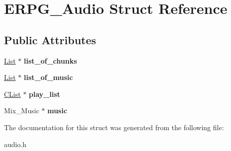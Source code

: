 \hypertarget{structERPG__Audio}{\section{E\-R\-P\-G\-\_\-\-Audio Struct Reference}
\label{structERPG__Audio}
}
\subsection*{Public Attributes}
\begin{DoxyCompactItemize}
\item 
\hypertarget{structERPG__Audio_a8f2bd7d006c2c6497637154fc92372c1}{\hyperlink{structList}{List} $\ast$ {\bfseries list\-\_\-of\-\_\-chunks}}\label{structERPG__Audio_a8f2bd7d006c2c6497637154fc92372c1}

\item 
\hypertarget{structERPG__Audio_a95dd40022b4d3deb2f32c62647495a3d}{\hyperlink{structList}{List} $\ast$ {\bfseries list\-\_\-of\-\_\-music}}\label{structERPG__Audio_a95dd40022b4d3deb2f32c62647495a3d}

\item 
\hypertarget{structERPG__Audio_a46e948241529b41bece2d1386ef3afda}{\hyperlink{structCList}{C\-List} $\ast$ {\bfseries play\-\_\-list}}\label{structERPG__Audio_a46e948241529b41bece2d1386ef3afda}

\item 
\hypertarget{structERPG__Audio_aab88deade69215ade0461e687301a00f}{Mix\-\_\-\-Music $\ast$ {\bfseries music}}\label{structERPG__Audio_aab88deade69215ade0461e687301a00f}

\end{DoxyCompactItemize}


The documentation for this struct was generated from the following file\-:\begin{DoxyCompactItemize}
\item 
audio.\-h\end{DoxyCompactItemize}
